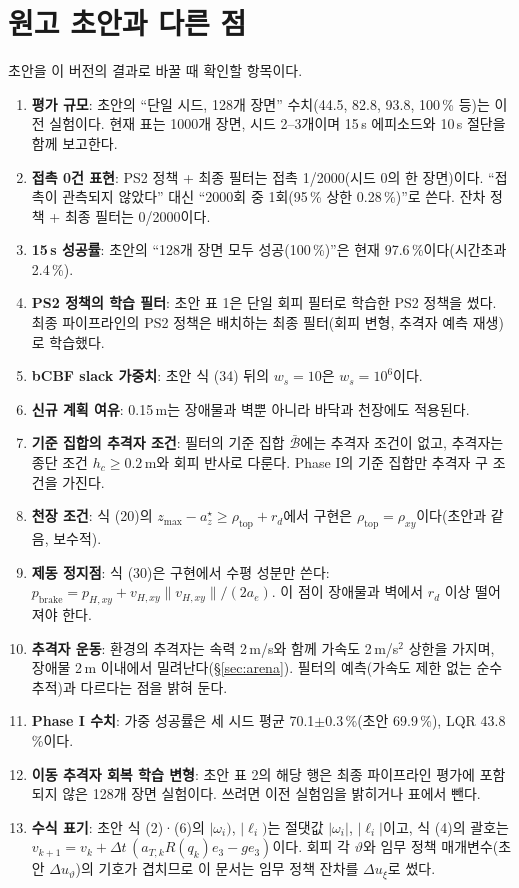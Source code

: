 \documentclass[10pt,a4paper]{article}
\newcommand{\Base}{\bar{\mathcal{B}}}
\begin{document}
\section{원고 초안과 다른 점}\label{app:draft}
초안을 이 버전의 결과로 바꿀 때 확인할 항목이다.
\begin{enumerate}
\item \textbf{평가 규모}: 초안의 ``단일 시드, 128개 장면'' 수치(44.5, 82.8, 93.8, 100\,\% 등)는 이전 실험이다. 현재 표는 1000개 장면, 시드 2--3개이며 15\,s 에피소드와 10\,s 절단을 함께 보고한다.
\item \textbf{접촉 0건 표현}: PS2 정책 + 최종 필터는 접촉 1/2000(시드 0의 한 장면)이다. ``접촉이 관측되지 않았다'' 대신 ``2000회 중 1회(95\,\% 상한 0.28\,\%)''로 쓴다. 잔차 정책 + 최종 필터는 0/2000이다.
\item \textbf{15\,s 성공률}: 초안의 ``128개 장면 모두 성공(100\,\%)''은 현재 97.6\,\%이다(시간초과 2.4\,\%).
\item \textbf{PS2 정책의 학습 필터}: 초안 표 1은 단일 회피 필터로 학습한 PS2 정책을 썼다. 최종 파이프라인의 PS2 정책은 배치하는 최종 필터(회피 변형, 추격자 예측 재생)로 학습했다.
\item \textbf{bCBF slack 가중치}: 초안 식 (34) 뒤의 $w_s=10$은 $w_s=10^6$이다.
\item \textbf{신규 계획 여유}: 0.15\,m는 장애물과 벽뿐 아니라 바닥과 천장에도 적용된다.
\item \textbf{기준 집합의 추격자 조건}: 필터의 기준 집합 $\Base$에는 추격자 조건이 없고, 추격자는 종단 조건 $h_c\ge0.2$\,m와 회피 반사로 다룬다. Phase I의 기준 집합만 추격자 구 조건을 가진다.
\item \textbf{천장 조건}: 식 (20)의 $z_{\max}-a^\star_z\ge\rho_{\mathrm{top}}+r_d$에서 구현은 $\rho_{\mathrm{top}}=\rho_{xy}$이다(초안과 같음, 보수적).
\item \textbf{제동 정지점}: 식 (30)은 구현에서 수평 성분만 쓴다: $p_{\mathrm{brake}}=p_{H,xy}+v_{H,xy}\|v_{H,xy}\|/(2a_e)$. 이 점이 장애물과 벽에서 $r_d$ 이상 떨어져야 한다.
\item \textbf{추격자 운동}: 환경의 추격자는 속력 2\,m/s와 함께 가속도 2\,m/s$^2$ 상한을 가지며, 장애물 2\,m 이내에서 밀려난다(\S\ref{sec:arena}). 필터의 예측(가속도 제한 없는 순수 추적)과 다르다는 점을 밝혀 둔다.
\item \textbf{Phase I 수치}: 가중 성공률은 세 시드 평균 70.1$\pm$0.3\,\%(초안 69.9\,\%), LQR 43.8\,\%이다.
\item \textbf{이동 추격자 회복 학습 변형}: 초안 표 2의 해당 행은 최종 파이프라인 평가에 포함되지 않은 128개 장면 실험이다. 쓰려면 이전 실험임을 밝히거나 표에서 뺀다.
\item \textbf{수식 표기}: 초안 식 (2)·(6)의 $|\omega_i)$, $|\ell_i)$는 절댓값 $|\omega_i|$, $|\ell_i|$이고, 식 (4)의 괄호는 $v_{k+1}=v_k+\Delta t\,(a_{T,k}R(q_k)e_3-ge_3)$이다. 회피 각 $\vartheta$와 임무 정책 매개변수(초안 $\Delta u_\vartheta$)의 기호가 겹치므로 이 문서는 임무 정책 잔차를 $\Delta u_\xi$로 썼다.
\end{enumerate}
\end{document}
